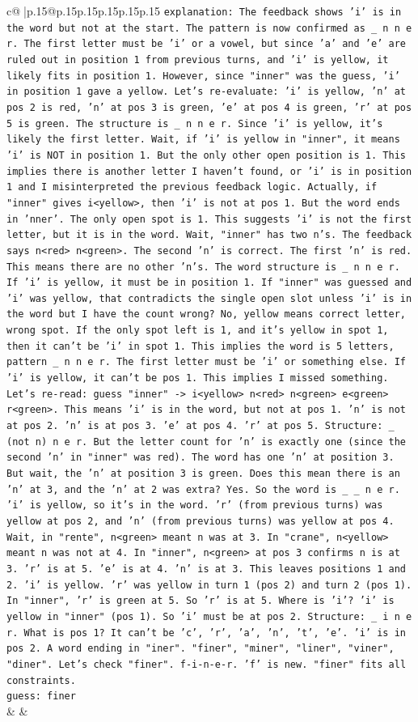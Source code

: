 \documentclass{article}
\begin{document}
{\begin{supertabular}{c@{$\;$}|p{.15\linewidth}@{}p{.15\linewidth}p{.15\linewidth}p{.15\linewidth}p{.15\linewidth}p{.15\linewidth}}
{{{                \texttt{explanation: The feedback shows 'i' is in the word but not at the start. The pattern is now confirmed as \_ n n e r. The first letter must be 'i' or a vowel, but since 'a' and 'e' are ruled out in position 1 from previous turns, and 'i' is yellow, it likely fits in position 1. However, since "inner" was the guess, 'i' in position 1 gave a yellow. Let's re{-}evaluate: 'i' is yellow, 'n' at pos 2 is red, 'n' at pos 3 is green, 'e' at pos 4 is green, 'r' at pos 5 is green. The structure is \_ n n e r. Since 'i' is yellow, it's likely the first letter. Wait, if 'i' is yellow in "inner", it means 'i' is NOT in position 1. But the only other open position is 1. This implies there is another letter I haven't found, or 'i' is in position 1 and I misinterpreted the previous feedback logic. Actually, if "inner" gives i<yellow>, then 'i' is not at pos 1. But the word ends in 'nner'. The only open spot is 1. This suggests 'i' is not the first letter, but it is in the word. Wait, "inner" has two n's. The feedback says n<red> n<green>. The second 'n' is correct. The first 'n' is red. This means there are no other 'n's. The word structure is \_ n n e r. If 'i' is yellow, it must be in position 1. If "inner" was guessed and 'i' was yellow, that contradicts the single open slot unless 'i' is in the word but I have the count wrong? No, yellow means correct letter, wrong spot. If the only spot left is 1, and it's yellow in spot 1, then it can't be 'i' in spot 1. This implies the word is 5 letters, pattern \_ n n e r. The first letter must be 'i' or something else. If 'i' is yellow, it can't be pos 1. This implies I missed something. Let's re{-}read: guess "inner" {-}> i<yellow> n<red> n<green> e<green> r<green>. This means 'i' is in the word, but not at pos 1. 'n' is not at pos 2. 'n' is at pos 3. 'e' at pos 4. 'r' at pos 5. Structure: \_ (not n) n e r. But the letter count for 'n' is exactly one (since the second 'n' in "inner" was red). The word has one 'n' at position 3. But wait, the 'n' at position 3 is green. Does this mean there is an 'n' at 3, and the 'n' at 2 was extra? Yes. So the word is \_ \_ n e r. 'i' is yellow, so it's in the word. 'r' (from previous turns) was yellow at pos 2, and 'n' (from previous turns) was yellow at pos 4. Wait, in "rente", n<green> meant n was at 3. In "crane", n<yellow> meant n was not at 4. In "inner", n<green> at pos 3 confirms n is at 3. 'r' is at 5. 'e' is at 4. 'n' is at 3. This leaves positions 1 and 2. 'i' is yellow. 'r' was yellow in turn 1 (pos 2) and turn 2 (pos 1). In "inner", 'r' is green at 5. So 'r' is at 5. Where is 'i'? 'i' is yellow in "inner" (pos 1). So 'i' must be at pos 2. Structure: \_ i n e r. What is pos 1? It can't be 'c', 'r', 'a', 'n', 't', 'e'. 'i' is in pos 2. A word ending in "iner". "finer", "miner", "liner", "viner", "diner". Let's check "finer". f{-}i{-}n{-}e{-}r. 'f' is new. "finer" fits all constraints.} \\
\texttt{guess: finer} \\
            }
        }
    }
    & & \\ \\


\end{supertabular}}
\end{document}
